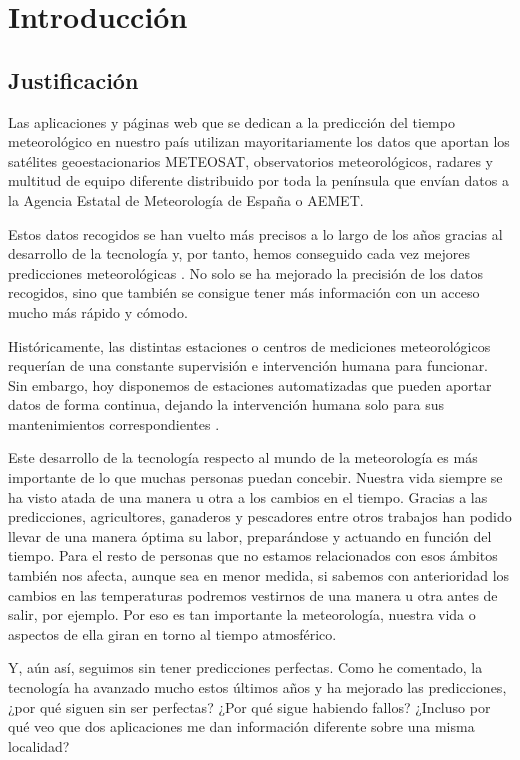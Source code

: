 \chapter{Introducción}

\section{Justificación}
Las aplicaciones y páginas web que se dedican a la predicción del tiempo meteorológico en nuestro país utilizan mayoritariamente los datos que aportan los satélites geoestacionarios METEOSAT, observatorios meteorológicos, radares y multitud de equipo diferente distribuido por toda la península que envían datos a la Agencia Estatal de Meteorología de España o AEMET.

Estos datos recogidos se han vuelto más precisos a lo largo de los años gracias al desarrollo de la tecnología y, por tanto, hemos conseguido cada vez mejores predicciones meteorológicas \cite{intro_1}. No solo se ha mejorado la precisión de los datos recogidos, sino que también se consigue tener más información con un acceso mucho más rápido y cómodo.

Históricamente, las distintas estaciones o centros de mediciones meteorológicos requerían de una constante supervisión e intervención humana para funcionar. Sin embargo, hoy disponemos de estaciones automatizadas que pueden aportar datos de forma continua, dejando la intervención humana solo para sus mantenimientos correspondientes \cite{intro_2}.

Este desarrollo de la tecnología respecto al mundo de la meteorología es más importante de lo que muchas personas puedan concebir. Nuestra vida siempre se ha visto atada de una manera u otra a los cambios en el tiempo. Gracias a las predicciones, agricultores, ganaderos y pescadores entre otros trabajos han podido llevar de una manera óptima su labor, preparándose y actuando en función del tiempo. Para el resto de personas que no estamos relacionados con esos ámbitos también nos afecta, aunque sea en menor medida, si sabemos con anterioridad los cambios en las temperaturas podremos vestirnos de una manera u otra antes de salir, por ejemplo. Por eso es tan importante la meteorología, nuestra vida o aspectos de ella giran en torno al tiempo atmosférico.

Y, aún así, seguimos sin tener predicciones perfectas. Como he comentado, la tecnología ha avanzado mucho estos últimos años y ha mejorado las predicciones, ¿por qué siguen sin ser perfectas? ¿Por qué sigue habiendo fallos? ¿Incluso por qué veo que dos aplicaciones me dan información diferente sobre una misma localidad?

